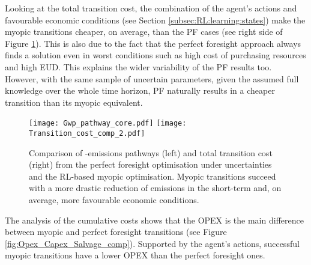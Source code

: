 Looking at the total transition cost, the combination of the agent's actions and favourable economic conditions (see Section \ref{subsec:RL:learning:states}) make the myopic transitions cheaper, on average, than the PF cases (see right side of Figure \ref{fig:Gwp_pathway_total_tran_cost}). This is also due to the fact that the perfect foresight approach always finds a solution even in worst conditions such as high cost of purchasing resources and high \gls{EUD}. This explains the wider variability of the PF results too. However, with the same sample of uncertain parameters, given the assumed full knowledge over the whole time horizon, PF naturally results in a cheaper transition than its myopic equivalent.

\begin{figure}[!htbp]
\centering
\texttt{[image: Gwp\_pathway\_core.pdf]}
\texttt{[image: Transition\_cost\_comp\_2.pdf]}
\caption{Comparison of -emissions pathways (left) and total transition cost (right) from the perfect foresight optimisation under uncertainties and the \gls{RL}-based myopic optimisation. Myopic transitions succeed with a more drastic reduction of emissions in the short-term and, on average, more favourable economic conditions.}
\label{fig:Gwp_pathway_total_tran_cost}
\end{figure}



\newpage
The analysis of the cumulative costs shows that the \gls{OPEX} is the main difference between myopic and perfect foresight transitions (see Figure \ref{fig:Opex_Capex_Salvage_comp}). Supported by the agent's actions, successful myopic transitions have a lower \gls{OPEX} than the perfect foresight ones.

